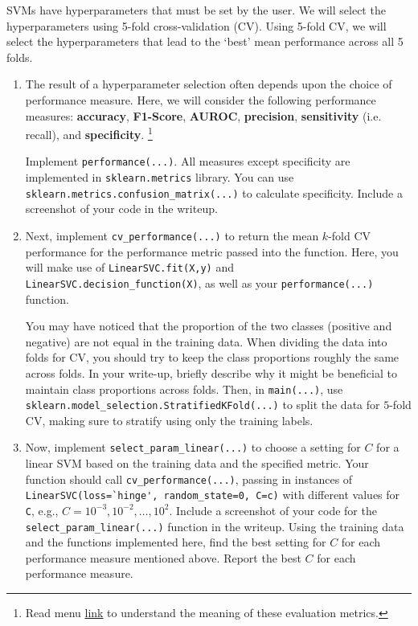 \documentclass[11pt]{article}
\begin{document}
SVMs have hyperparameters that must be set by the user. We will select the hyperparameters using 5-fold cross-validation (CV). Using 5-fold CV, we will select the hyperparameters that lead to the `best' mean performance across all 5 folds.

\begin{enumerate}

\item {} The result of a hyperparameter selection often depends upon the choice of performance measure. Here, we will consider the following performance measures: \textbf{accuracy}, \textbf{F1-Score}, \textbf{AUROC}, \textbf{precision}, \textbf{sensitivity} (i.e. recall), and \textbf{specificity}.
\footnote{Read menu \href{http://scikit-learn.org/stable/modules/model_evaluation.html#roc-metrics}{link} to understand the meaning of these evaluation metrics.}

Implement \verb|performance(...)|. All measures except specificity are implemented in \verb|sklearn.metrics| library. You can use \verb|sklearn.metrics.confusion_matrix(...)| to calculate specificity. Include a screenshot of your code in the writeup.
\vspace{3cm}

\item {} Next, implement \verb|cv_performance(...)| to return the mean $k$-fold CV performance for the performance metric passed into the function. Here, you will make use of \verb|LinearSVC.fit(X,y)| and \verb|LinearSVC.decision_function(X)|, as well as your \verb|performance(...)| function.

You may have noticed that the proportion of the two classes (positive and negative) are not equal in the training data. When dividing the data into folds for CV, you should try to keep the class proportions roughly the same across folds. In your write-up, briefly describe why it might be beneficial to maintain class proportions across folds. Then, in \verb|main(...)|, use \verb|sklearn.model_selection.StratifiedKFold(...)| to split the data for $5$-fold CV, making sure to stratify using only the training labels.
\vspace{3cm}

\item {} Now, implement \verb|select_param_linear(...)| to choose a setting for $C$ for a linear SVM based on the training data and the specified metric. Your function should call \verb|cv_performance(...)|, passing in instances of \verb|LinearSVC(loss=`hinge', random_state=0, C=c)| with different values for \verb|C|, e.g., $C = 10^{-3}, 10^{-2}, \ldots, 10^{2}$. Include a screenshot of your code for the \verb|select_param_linear(...)| function in the writeup. Using the training data and the functions implemented here, find the best setting for $C$ for each performance measure mentioned above. Report the best $C$ for each performance measure.
\vspace{9cm}

\end{enumerate}
\end{document}
